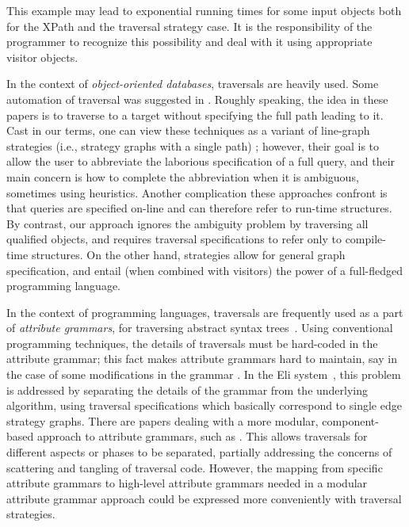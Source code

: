 This example may lead to exponential running times for some input
objects both for the XPath and the traversal strategy case.  It is the
responsibility of the programmer to recognize this possibility and
deal with it using appropriate visitor objects.

In the context of {\em object-oriented databases}, traversals are
heavily used. Some automation of traversal was suggested in
\cite{ns:vldb88,bv:navigation,MarSho:abbrev-query-int93,querying-oodb:kim92,ioannidis:path-expr}.
Roughly speaking, the idea in these papers is to traverse to a target
without specifying the full path leading to it.  Cast in our terms,
one can view these techniques as a variant of line-graph strategies
(i.e., strategy graphs with a single path) ; however, their goal is to
allow the user to abbreviate the laborious specification of a full
query, and their main concern is how to complete the abbreviation when
it is ambiguous, sometimes using heuristics.  Another complication
these approaches confront is that queries are specified on-line and
can therefore refer to run-time structures.  By contrast, our approach
ignores the ambiguity problem by traversing all qualified objects, and
requires traversal specifications to refer only to compile-time
structures. On the other hand, strategies allow for general graph
specification, and entail (when combined with visitors) the power of a
full-fledged programming language.

In the context of programming languages, traversals are frequently
used as a part of {\em attribute grammars}, for traversing abstract
syntax trees~\cite{WaiteGoos84}.  Using conventional programming
techniques, the details of traversals must be hard-coded in the
attribute grammar; this fact makes attribute grammars hard to
maintain, say in the case of some modifications in the grammar
\cite{kastens:waite}.  In the Eli system~\cite{ELI}, this problem is
addressed by separating the details of the grammar from the underlying
algorithm, using traversal specifications which basically correspond
to single edge strategy graphs.  There are papers dealing with a more
modular, component-based approach to attribute grammars, such as
\cite{composable-attribute-gr:popl92}. This allows traversals for
different aspects or phases to be separated, partially addressing the
concerns of scattering and tangling of traversal code.  However, the
mapping from specific attribute grammars to high-level attribute
grammars needed in a modular attribute grammar approach could be
expressed more conveniently with traversal strategies.

